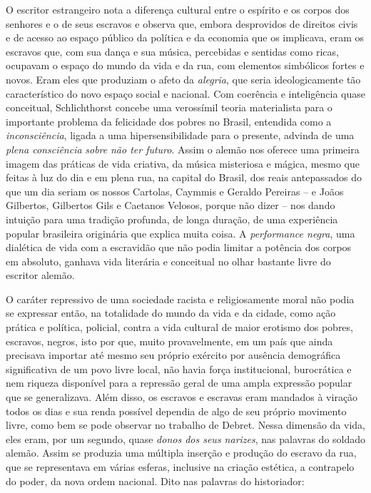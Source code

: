 O escritor estrangeiro nota a diferença cultural entre o espírito e os
corpos dos senhores e o de seus escravos e observa que, embora
desprovidos de direitos civis e de acesso ao espaço público da política
e da economia que os implicava, eram os escravos que, com sua dança e
sua música, percebidas e sentidas como ricas, ocupavam o espaço do mundo
da vida e da rua, com elementos simbólicos fortes e novos. Eram eles que
produziam o afeto da \emph{alegria}, que seria ideologicamente tão
característico do novo espaço social e nacional. Com coerência e
inteligência quase conceitual, Schlichthorst concebe uma verossímil
teoria materialista para o importante problema da felicidade dos pobres
no Brasil, entendida como a \emph{inconsciência}, ligada a uma
hipersensibilidade para o presente, advinda de uma \emph{plena
consciência} \emph{sobre} \emph{não ter futuro}. Assim o alemão nos
oferece uma primeira imagem das práticas de vida criativa, da música
misteriosa e mágica, mesmo que feitas à luz do dia e em plena rua, na
capital do Brasil, dos reais antepassados do que um dia seriam os nossos
Cartolas, Caymmis e Geraldo Pereiras -- e Joãos Gilbertos, Gilbertos
Gils e Caetanos Velosos, porque não dizer -- nos dando intuição para uma
tradição profunda, de longa duração, de uma experiência popular
brasileira originária que explica muita coisa. A \emph{performance
negra}, uma dialética de vida com a escravidão que não podia limitar a
potência dos corpos em absoluto, ganhava vida literária e conceitual no
olhar bastante livre do escritor alemão.

O caráter repressivo de uma sociedade racista e religiosamente moral não
podia se expressar então, na totalidade do mundo da vida e da cidade,
como ação prática e política, policial, contra a vida cultural de maior
erotismo dos pobres, escravos, negros, isto por que, muito
provavelmente, em um país que ainda precisava importar até mesmo seu
próprio exército por ausência demográfica significativa de um povo livre
local, não havia força institucional, burocrática e nem riqueza
disponível para a repressão geral de uma ampla expressão popular que se
generalizava. Além disso, os escravos e escravas eram mandados à viração
todos os dias e sua renda possível dependia de algo de seu próprio
movimento livre, como bem se pode observar no trabalho de Debret. Nessa
dimensão da vida, eles eram, por um segundo, quase \emph{donos dos seus
narizes}, nas palavras do soldado alemão. Assim se produzia uma múltipla
inserção e produção do escravo da rua, que se representava em várias
esferas, inclusive na criação estética, a contrapelo do poder, da nova
ordem nacional. Dito nas palavras do historiador:

